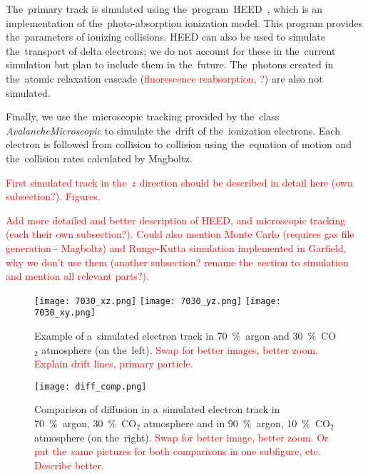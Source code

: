 		The~primary track is simulated using the~program~\ac{HEED}~\cite{HEED}, which is an implementation of the~photo-absorption ionization model. This program provides the~parameters of ionizing collisions. \ac{HEED} can also be used to simulate the~transport of delta electrons; we do not account for these in the~current simulation but plan to include them in the~future. The~photons created in the~atomic relaxation cascade (\textcolor{red}{fluorescence reabsorption, ?}) are also not simulated.
		
		Finally, we use the~microscopic tracking provided by the~class \textit{AvalancheMicroscopic} to simulate the~drift of the~ionization electrons. Each electron is followed from collision to collision using the~equation of motion and the~collision rates calculated by Magboltz.
		
		\textcolor{red}{First simulated track in the~$z$ direction should be described in detail here (own subsection?). Figures.}
		
		\textcolor{red}{Add more detailed and better description of HEED, and microscopic tracking (each their own subsection?). Could also mention Monte Carlo (requires gas file generation - Magboltz) and Runge-Kutta simulation implemented in Garfield, why we don't use them (another subsection? rename the~section to \garfieldpp simulation and mention all relevant parts?).}
		
		\begin{figure}[H]
			\centering
			\texttt{[image: 7030\_xz.png]}
			\texttt{[image: 7030\_yz.png]}
			\texttt{[image: 7030\_xy.png]}
			\caption{Example of a~simulated electron track in 70~\%~argon and 30~\%~CO$_2$ atmosphere (on the~left). \textcolor{red}{Swap for better images, better zoom. Explain drift lines, primary particle.}}
			\label{fig:7030sim}
		\end{figure}
		
		\begin{figure}[H]
			\centering
			\texttt{[image: diff\_comp.png]}
			\caption{Comparison of diffusion in a~simulated electron track in 70~\%~argon, 30~\%~CO$_2$ atmosphere and in 90~\%~argon, 10~\%~CO$_2$ atmosphere (on the~right). \textcolor{red}{Swap for better image, better zoom. Or put the~same pictures for both comparisons in one subfigure, etc. Describe better.}}
			\label{fig:diffcomp}
		\end{figure}
	
